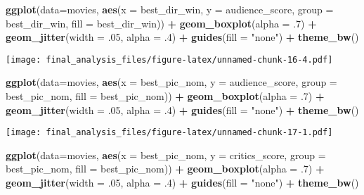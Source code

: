 \documentclass[]{article}
\newenvironment{Shaded}{\begin{snugshade}}{\end{snugshade}}
\newcommand{\KeywordTok}[1]{\textcolor[rgb]{0.13,0.29,0.53}{\textbf{#1}}}
\newcommand{\DataTypeTok}[1]{\textcolor[rgb]{0.13,0.29,0.53}{#1}}
\newcommand{\DecValTok}[1]{\textcolor[rgb]{0.00,0.00,0.81}{#1}}
\newcommand{\StringTok}[1]{\textcolor[rgb]{0.31,0.60,0.02}{#1}}
\newcommand{\OperatorTok}[1]{\textcolor[rgb]{0.81,0.36,0.00}{\textbf{#1}}}
\newcommand{\NormalTok}[1]{#1}
\begin{document}
\begin{Shaded}
\begin{Highlighting}[]
\KeywordTok{ggplot}\NormalTok{(}\DataTypeTok{data=}\NormalTok{movies, }\KeywordTok{aes}\NormalTok{(}\DataTypeTok{x =}\NormalTok{ best_dir_win, }\DataTypeTok{y =}\NormalTok{ audience_score, }\DataTypeTok{group =}\NormalTok{ best_dir_win, }\DataTypeTok{fill =}\NormalTok{ best_dir_win)) }\OperatorTok{+}\StringTok{ }\KeywordTok{geom_boxplot}\NormalTok{(}\DataTypeTok{alpha =}\NormalTok{ .}\DecValTok{7}\NormalTok{) }\OperatorTok{+}\StringTok{ }\KeywordTok{geom_jitter}\NormalTok{(}\DataTypeTok{width =}\NormalTok{ .}\DecValTok{05}\NormalTok{, }\DataTypeTok{alpha =}\NormalTok{ .}\DecValTok{4}\NormalTok{) }\OperatorTok{+}\StringTok{ }\KeywordTok{guides}\NormalTok{(}\DataTypeTok{fill =} \StringTok{"none"}\NormalTok{) }\OperatorTok{+}\StringTok{ }\KeywordTok{theme_bw}\NormalTok{()}
\end{Highlighting}
\end{Shaded}

\texttt{[image: final\_analysis\_files/figure-latex/unnamed-chunk-16-4.pdf]}

\begin{Shaded}
\begin{Highlighting}[]
\KeywordTok{ggplot}\NormalTok{(}\DataTypeTok{data=}\NormalTok{movies, }\KeywordTok{aes}\NormalTok{(}\DataTypeTok{x =}\NormalTok{ best_pic_nom, }\DataTypeTok{y =}\NormalTok{ audience_score, }\DataTypeTok{group =}\NormalTok{ best_pic_nom, }\DataTypeTok{fill =}\NormalTok{ best_pic_nom)) }\OperatorTok{+}\StringTok{ }\KeywordTok{geom_boxplot}\NormalTok{(}\DataTypeTok{alpha =}\NormalTok{ .}\DecValTok{7}\NormalTok{) }\OperatorTok{+}\StringTok{ }\KeywordTok{geom_jitter}\NormalTok{(}\DataTypeTok{width =}\NormalTok{ .}\DecValTok{05}\NormalTok{, }\DataTypeTok{alpha =}\NormalTok{ .}\DecValTok{4}\NormalTok{) }\OperatorTok{+}\StringTok{ }\KeywordTok{guides}\NormalTok{(}\DataTypeTok{fill =} \StringTok{"none"}\NormalTok{) }\OperatorTok{+}\StringTok{ }\KeywordTok{theme_bw}\NormalTok{()}
\end{Highlighting}
\end{Shaded}

\texttt{[image: final\_analysis\_files/figure-latex/unnamed-chunk-17-1.pdf]}

\begin{Shaded}
\begin{Highlighting}[]
\KeywordTok{ggplot}\NormalTok{(}\DataTypeTok{data=}\NormalTok{movies, }\KeywordTok{aes}\NormalTok{(}\DataTypeTok{x =}\NormalTok{ best_pic_nom, }\DataTypeTok{y =}\NormalTok{ critics_score, }\DataTypeTok{group =}\NormalTok{ best_pic_nom, }\DataTypeTok{fill =}\NormalTok{ best_pic_nom)) }\OperatorTok{+}\StringTok{ }\KeywordTok{geom_boxplot}\NormalTok{(}\DataTypeTok{alpha =}\NormalTok{ .}\DecValTok{7}\NormalTok{) }\OperatorTok{+}\StringTok{ }\KeywordTok{geom_jitter}\NormalTok{(}\DataTypeTok{width =}\NormalTok{ .}\DecValTok{05}\NormalTok{, }\DataTypeTok{alpha =}\NormalTok{ .}\DecValTok{4}\NormalTok{) }\OperatorTok{+}\StringTok{ }\KeywordTok{guides}\NormalTok{(}\DataTypeTok{fill =} \StringTok{"none"}\NormalTok{) }\OperatorTok{+}\StringTok{ }\KeywordTok{theme_bw}\NormalTok{()}
\end{Highlighting}
\end{Shaded}
\end{document}
